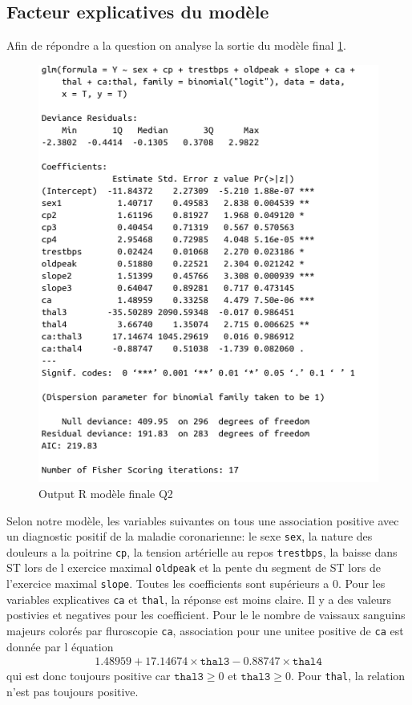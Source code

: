\documentclass{article}
\begin{document}
	\subsection{Facteur explicatives du modèle}
	Afin de répondre a la question on analyse la sortie du modèle final \ref{model_final_q2_oouptut}.
	\begin{figure}[H]
		\includegraphics[width=\textwidth]{graphiques/modele_final_q2}
		\caption{Output R modèle finale Q2}
		\label{model_final_q2_oouptut}
	\end{figure}
	Selon notre modèle, les variables suivantes on tous une association positive avec un diagnostic positif de la maladie coronarienne: le sexe \texttt{sex}, la nature des douleurs a la poitrine \texttt{cp}, la tension artérielle au repos \texttt{trestbps}, la baisse dans ST lors de l exercice maximal \texttt{oldpeak} et la pente du segment de ST lors de l’exercice maximal \texttt{slope}. Toutes les coefficients sont supérieurs a $0$. Pour les variables explicatives \texttt{ca} et \texttt{thal}, la réponse est moins claire. Il y a des valeurs postivies et negatives pour les coefficient. Pour le le nombre de vaissaux sanguins majeurs colorés par fluroscopie \texttt{ca}, association pour une unitee positive de \texttt{ca} est donnée par l équation 
	\begin{align}\label{eq_ca}
	1.48959 + 17.14674 \times \texttt{thal3} -0.88747 \times \texttt{thal4}
	\end{align}
	qui est donc toujours positive car $\texttt{thal3} \geq 0$ et $\texttt{thal3} \geq 0$. Pour \texttt{thal}, la relation n'est pas toujours positive. 
\end{document}
